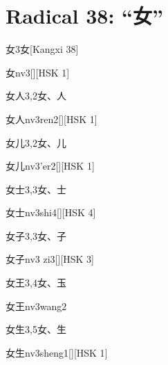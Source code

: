 
\section*{Radical 38: ``⼥''}

\begin{entry}{女}{3}{⼥}[Kangxi 38]
  \begin{phonetics}{女}{nv3}[][HSK 1]
  \end{phonetics}
\end{entry}

\begin{entry}{女人}{3,2}{⼥、⼈}
  \begin{phonetics}{女人}{nv3ren2}[][HSK 1]
  \end{phonetics}
\end{entry}

\begin{entry}{女儿}{3,2}{⼥、⼉}
  \begin{phonetics}{女儿}{nv3'er2}[][HSK 1]
  \end{phonetics}
\end{entry}

\begin{entry}{女士}{3,3}{⼥、⼠}
  \begin{phonetics}{女士}{nv3shi4}[][HSK 4]
  \end{phonetics}
\end{entry}

\begin{entry}{女子}{3,3}{⼥、⼦}
  \begin{phonetics}{女子}{nv3 zi3}[][HSK 3]
  \end{phonetics}
\end{entry}

\begin{entry}{女王}{3,4}{⼥、⽟}
  \begin{phonetics}{女王}{nv3wang2}
  \end{phonetics}
\end{entry}

\begin{entry}{女生}{3,5}{⼥、⽣}
  \begin{phonetics}{女生}{nv3sheng1}[][HSK 1]
  \end{phonetics}
\end{entry}

